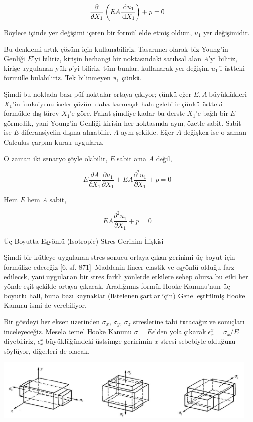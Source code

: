 \documentclass[12pt,fleqn]{article}\usepackage{../../common}
\begin{document}
$$
\frac{\partial }{\partial X_1} \left( E A \frac{\,\mathrm{d} u_1}{\,\mathrm{d} X_1} \right) + p = 0
$$

Böylece içinde yer değişimi içeren bir formül elde etmiş oldum, $u_1$ yer
değişimidir.

Bu denklemi artık çözüm için kullanabiliriz. Tasarımcı olarak biz Young'in
Genliği $E$'yi biliriz, kirişin herhangi bir noktasındaki satıhsal alan $A$'yi
biliriz, kirişe uygulanan yük $p$'yi biliriz, tüm bunları kullanarak yer değişim
$u_1$'i üstteki formülle bulabiliriz. Tek bilinmeyen $u_1$ çünkü.

Şimdi bu noktada bazı püf noktalar ortaya çıkıyor; çünkü eğer $E,A$ büyüklükleri
$X_1$'in fonksiyonu iseler çözüm daha karmaşık hale gelebilir çünkü üstteki
formülde dış türev $X_1$'e göre. Fakat şimdiye kadar bu derste $X_1$'e bağlı bir
$E$ görmedik, yani Young'in Genliği kirişin her noktasında aynı, özetle sabit.
Sabit ise $E$ diferansiyelin dışına alınabilir. $A$ aynı şekilde. Eğer $A$
değişken ise o zaman Calculus çarpım kuralı uygularız.

O zaman iki senaryo şöyle olabilir, $E$ sabit ama $A$ değil,

$$
E \frac{\partial A}{\partial X_1} \frac{\partial u_1}{\partial X_1} +
EA \frac{\partial^2 u_1}{\partial X_1} + p = 0
$$

Hem $E$ hem $A$ sabit,

$$
E A \frac{\partial^2 u_1}{\partial X_1} + p = 0
$$

Üç Boyutta Eşyönlü (Isotropic) Stres-Gerinim İlişkisi 

Şimdi bir kütleye uygulanan stres sonucu ortaya çıkan gerinimi üç boyut için
formülize edeceğiz [6, sf. 871]. Maddenin lineer elastik ve eşyönlü olduğu farz
edilecek, yani uygulanan bir stres farklı yönlerde etkilere sebep olursa bu etki
her yönde eşit şekilde ortaya çıkacak. Aradığımız formül Hooke Kanunu'nun üç
boyutlu hali, buna bazı kaynaklar (listelenen şartlar için) Genelleştirilmiş
Hooke Kanunu ismi de verebiliyor.

Bir gövdeyi her eksen üzerinden $\sigma_x$, $\sigma_y$, $\sigma_z$ streslerine
tabi tutacağız ve sonuçları inceleyeceğiz. Mesela temel Hooke Kanunu $\sigma = E
\epsilon$'den yola çıkarak $\epsilon_x^x = \sigma_x / E$ diyebiliriz,
$\epsilon_x^x$ büyüklüğündeki üstsimge gerinimin $x$ stresi sebebiyle olduğunu
söylüyor, diğerleri de olacak.

\includegraphics[width=35em]{phy_020_strs_00_10.jpg}
\end{document}
